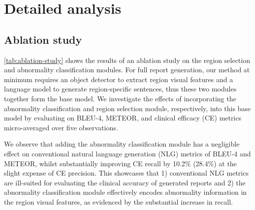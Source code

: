 \documentclass[10pt,twocolumn,letterpaper]{article}
\begin{document}
\section{Detailed analysis}
\subsection{Ablation study}\label{appendix:ablation_study}

\cref{tab:ablation-study} shows the results of an ablation study on the region selection and abnormality classification modules. For full report generation, our method at minimum requires an object detector to extract region visual features and a language model to generate region-specific sentences, thus these two modules together form the base model. We investigate the effects of incorporating the abnormality classification and region selection module, respectively, into this base model by evaluating on BLEU-4, METEOR, and clinical efficacy (CE) metrics micro-averaged over five observations.

We observe that adding the abnormality classification module has a negligible effect on conventional natural language generation (NLG) metrics of BLEU-4 and METEOR, whilst substantially improving CE recall by 10.2\% (28.4\%) at the slight expense of CE precision. This showcases that 1) conventional NLG metrics are ill-suited for evaluating the clinical accuracy of generated reports \cite{boag2020baselines, liu2019clinically, pino2020inspecting} and 2) the abnormality classification module effectively encodes abnormality information in the region visual features, as evidenced by the substantial increase in recall.
\end{document}
